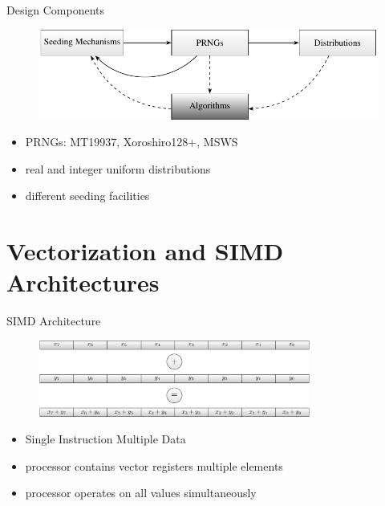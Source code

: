 \documentclass[aspectratio=169]{beamer}
\begin{document}
    \begin{frame}{Design Components}
      \begin{figure}
        \includegraphics[width=\textwidth]{figures/api_parts.pdf}
      \end{figure}
      \begin{itemize}
        \pause\item PRNGs: MT19937, Xoroshiro128+, MSWS
        \pause\item real and integer uniform distributions
        \pause\item different seeding facilities
      \end{itemize}
    \end{frame}

  \section{Vectorization and SIMD Architectures} %
    \begin{frame}{SIMD Architecture}
      \begin{figure}
        \includegraphics[width=0.8\textwidth]{figures/simd_vector_operations.pdf}
      \end{figure}
      \begin{itemize}
        \pause
        \item Single Instruction Multiple Data
        \pause
        \item processor contains vector registers multiple elements
        \pause
        \item processor operates on all values simultaneously
      \end{itemize}
    \end{frame}
\end{document}
